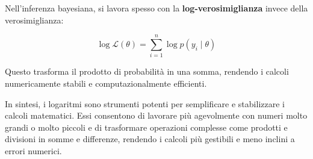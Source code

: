 \documentclass[
  italian,
  letterpaper,
  a4paper,
  11pt,
  open=any]{scrbook}
\theoremstyle{plain}
\theoremstyle{definition}
\theoremstyle{definition}
\theoremstyle{remark}
\begin{document}
\begin{tcolorbox}[enhanced jigsaw, arc=.35mm, bottomrule=.15mm, bottomtitle=1mm, breakable, colback=white, colbacktitle=quarto-callout-tip-color!10!white, colframe=quarto-callout-tip-color-frame, coltitle=black, left=2mm, leftrule=.75mm, opacityback=0, opacitybacktitle=0.6, rightrule=.15mm, title=\textcolor{quarto-callout-tip-color}{\faLightbulb}\hspace{0.5em}{Applicazione alla verosimiglianza bayesiana}, titlerule=0mm, toprule=.15mm, toptitle=1mm]

Nell'inferenza bayesiana, si lavora spesso con la
\textbf{log-verosimiglianza} invece della verosimiglianza:

\[
\log \mathcal{L}(\theta) = \sum_{i=1}^n \log p(y_i \mid \theta)
\]

Questo trasforma il prodotto di probabilità in una somma, rendendo i
calcoli numericamente stabili e computazionalmente efficienti.

\end{tcolorbox}

In sintesi, i logaritmi sono strumenti potenti per semplificare e
stabilizzare i calcoli matematici. Essi consentono di lavorare più
agevolmente con numeri molto grandi o molto piccoli e di trasformare
operazioni complesse come prodotti e divisioni in somme e differenze,
rendendo i calcoli più gestibili e meno inclini a errori numerici.
\end{document}
